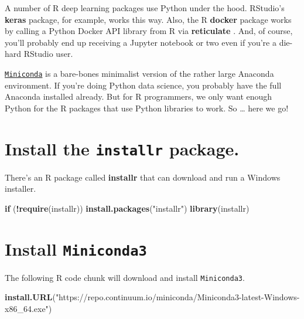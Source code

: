 \documentclass[]{book}
\newenvironment{Shaded}{\begin{snugshade}}{\end{snugshade}}
\newcommand{\ControlFlowTok}[1]{\textcolor[rgb]{0.13,0.29,0.53}{\textbf{#1}}}
\newcommand{\KeywordTok}[1]{\textcolor[rgb]{0.13,0.29,0.53}{\textbf{#1}}}
\newcommand{\NormalTok}[1]{#1}
\newcommand{\OperatorTok}[1]{\textcolor[rgb]{0.81,0.36,0.00}{\textbf{#1}}}
\newcommand{\StringTok}[1]{\textcolor[rgb]{0.31,0.60,0.02}{#1}}
\theoremstyle{definition}
\theoremstyle{definition}
\theoremstyle{definition}
\theoremstyle{remark}
\begin{document}
A number of R deep learning packages use Python under the hood.
RStudio's \textbf{keras} \citep{R-keras} package, for example, works
this way. Also, the R \textbf{docker} \citep{R-docker} package works by
calling a Python Docker API library from R via \textbf{reticulate}
\citep{R-reticulate}. And, of course, you'll probably end up receiving a
Jupyter notebook or two even if you're a die-hard RStudio user.

\href{https://conda.io/miniconda.html}{\texttt{Miniconda}} is a
bare-bones minimalist version of the rather large Anaconda environment.
If you're doing Python data science, you probably have the full Anaconda
installed already. But for R programmers, we only want enough Python for
the R packages that use Python libraries to work. So \ldots{} here we
go!

\hypertarget{install-the-installr-package.}{%
\section{\texorpdfstring{Install the \texttt{installr}
package.}{Install the installr package.}}\label{install-the-installr-package.}}

There's an R package called \textbf{installr} \citep{R-installr} that
can download and run a Windows installer.

\begin{Shaded}
\begin{Highlighting}[]
\ControlFlowTok{if}\NormalTok{ (}\OperatorTok{!}\KeywordTok{require}\NormalTok{(installr)) }\KeywordTok{install.packages}\NormalTok{(}\StringTok{"installr"}\NormalTok{)}
\KeywordTok{library}\NormalTok{(installr)}
\end{Highlighting}
\end{Shaded}

\hypertarget{install-miniconda3}{%
\section{\texorpdfstring{Install
\texttt{Miniconda3}}{Install Miniconda3}}\label{install-miniconda3}}

The following R code chunk will download and install
\texttt{Miniconda3}.

\begin{Shaded}
\begin{Highlighting}[]
\KeywordTok{install.URL}\NormalTok{(}\StringTok{"https://repo.continuum.io/miniconda/Miniconda3-latest-Windows-x86_64.exe"}\NormalTok{)}
\end{Highlighting}
\end{Shaded}
\end{document}
